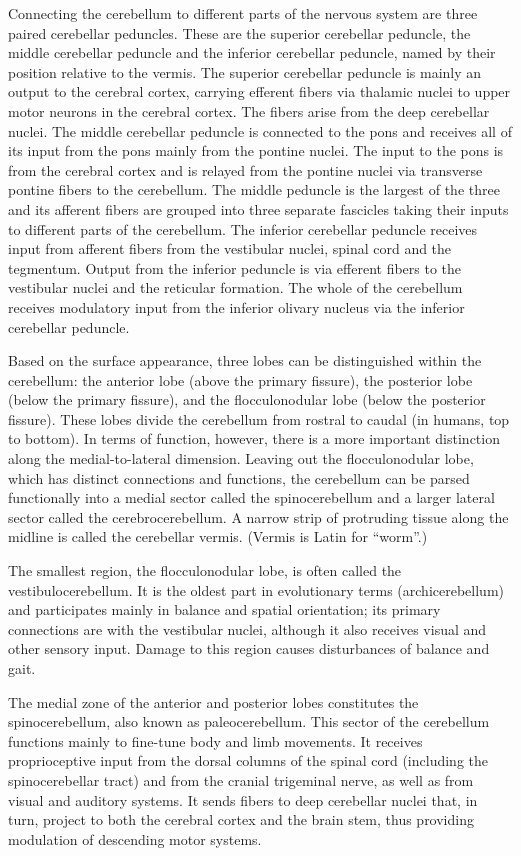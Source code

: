 Connecting the cerebellum to different parts of the nervous system are three paired cerebellar peduncles. These are the superior cerebellar peduncle, the middle cerebellar peduncle and the inferior cerebellar peduncle, named by their position relative to the vermis. The superior cerebellar peduncle is mainly an output to the cerebral cortex, carrying efferent fibers via thalamic nuclei to upper motor neurons in the cerebral cortex. The fibers arise from the deep cerebellar nuclei. The middle cerebellar peduncle is connected to the pons and receives all of its input from the pons mainly from the pontine nuclei. The input to the pons is from the cerebral cortex and is relayed from the pontine nuclei via transverse pontine fibers to the cerebellum. The middle peduncle is the largest of the three and its afferent fibers are grouped into three separate fascicles taking their inputs to different parts of the cerebellum. The inferior cerebellar peduncle receives input from afferent fibers from the vestibular nuclei, spinal cord and the tegmentum. Output from the inferior peduncle is via efferent fibers to the vestibular nuclei and the reticular formation. The whole of the cerebellum receives modulatory input from the inferior olivary nucleus via the inferior cerebellar peduncle.

Based on the surface appearance, three lobes can be distinguished within the cerebellum: the anterior lobe (above the primary fissure), the posterior lobe (below the primary fissure), and the flocculonodular lobe (below the posterior fissure). These lobes divide the cerebellum from rostral to caudal (in humans, top to bottom). In terms of function, however, there is a more important distinction along the medial-to-lateral dimension. Leaving out the flocculonodular lobe, which has distinct connections and functions, the cerebellum can be parsed functionally into a medial sector called the spinocerebellum and a larger lateral sector called the cerebrocerebellum. A narrow strip of protruding tissue along the midline is called the cerebellar vermis. (Vermis is Latin for ``worm''.)

The smallest region, the flocculonodular lobe, is often called the vestibulocerebellum. It is the oldest part in evolutionary terms (archicerebellum) and participates mainly in balance and spatial orientation; its primary connections are with the vestibular nuclei, although it also receives visual and other sensory input. Damage to this region causes disturbances of balance and gait.

The medial zone of the anterior and posterior lobes constitutes the spinocerebellum, also known as paleocerebellum. This sector of the cerebellum functions mainly to fine-tune body and limb movements. It receives proprioceptive input from the dorsal columns of the spinal cord (including the spinocerebellar tract) and from the cranial trigeminal nerve, as well as from visual and auditory systems. It sends fibers to deep cerebellar nuclei that, in turn, project to both the cerebral cortex and the brain stem, thus providing modulation of descending motor systems.

